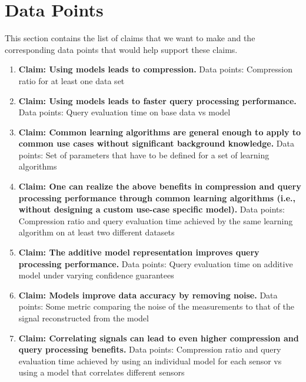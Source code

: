 \section{Data Points}

This section contains the list of claims that we want to make and the corresponding data points that would help support these claims.

\begin{enumerate}
\item {\bf Claim: Using models leads to compression.}
Data points: Compression ratio for at least one data set\\

\item {\bf Claim: Using models leads to faster query processing performance.}
Data points: Query evaluation time on base data vs model\\

\item {\bf Claim: Common learning algorithms are general enough to apply to common use cases without significant background knowledge.}
Data points: Set of parameters that have to be defined for a set of learning algorithms\\

\item {\bf Claim: One can realize the above benefits in compression and query processing performance through common learning algorithms (i.e., without designing a custom use-case specific model).}
Data points: Compression ratio and query evaluation time achieved by the same learning algorithm on at least two different datasets\\

\item {\bf Claim: The additive model representation improves query processing performance.}
Data points: Query evaluation time on additive model under varying confidence guarantees\\

\item {\bf Claim: Models improve data accuracy by removing noise.} 
Data points: Some metric comparing the noise of the measurements to that of the signal reconstructed from the model\\

\item {\bf Claim: Correlating signals can lead to even higher compression and query processing benefits.}
Data points: Compression ratio and query evaluation time achieved by using an individual model for each sensor vs using a model that correlates different sensors
\end{enumerate}